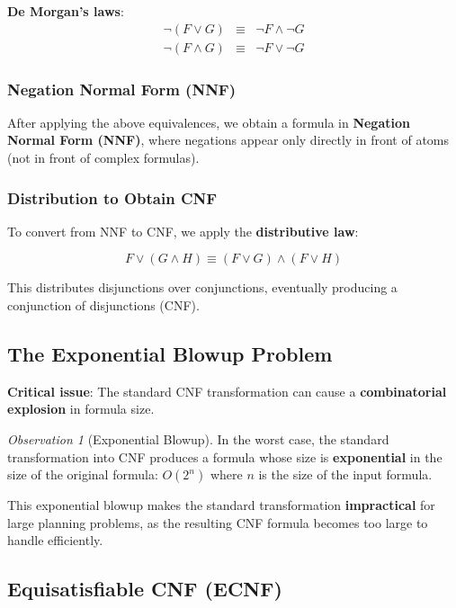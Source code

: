 \documentclass[11pt,a4paper]{article}
\theoremstyle{definition}
\theoremstyle{plain}
\theoremstyle{remark}
\newtheorem*{observation}{Observation}
\begin{document}
\textbf{De Morgan's laws}:
\[
\begin{array}{lcl}
\neg(F \lor G) &\equiv& \neg F \land \neg G \\
\neg(F \land G) &\equiv& \neg F \lor \neg G
\end{array}
\]

\subsubsection{Negation Normal Form (NNF)}

After applying the above equivalences, we obtain a formula in \textbf{Negation Normal Form (NNF)}, where negations appear only directly in front of atoms (not in front of complex formulas).

\subsubsection{Distribution to Obtain CNF}

To convert from NNF to CNF, we apply the \textbf{distributive law}:

\[
F \lor (G \land H) \equiv (F \lor G) \land (F \lor H)
\]

This distributes disjunctions over conjunctions, eventually producing a conjunction of disjunctions (CNF).

\subsection{The Exponential Blowup Problem}

\textbf{Critical issue}: The standard CNF transformation can cause a \textbf{combinatorial explosion} in formula size.

\begin{tcolorbox}[colback=red!5!white,colframe=red!75!black,title=\textbf{Exponential Blowup Problem}]
\begin{observation}[Exponential Blowup]
In the worst case, the standard transformation into CNF produces a formula whose size is \textbf{exponential} in the size of the original formula: $O(2^n)$ where $n$ is the size of the input formula.
\end{observation}
\end{tcolorbox}

This exponential blowup makes the standard transformation \textbf{impractical} for large planning problems, as the resulting CNF formula becomes too large to handle efficiently.

\subsection{Equisatisfiable CNF (ECNF)}
\end{document}
